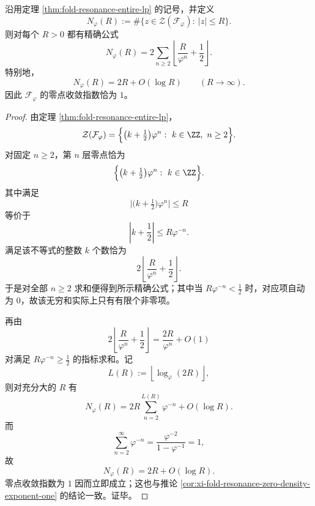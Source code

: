 \begin{theorem}\label{cor:xi-resonance-entire-zero-count-explicit-linear-density}
沿用定理 \ref{thm:fold-resonance-entire-lp} 的记号，并定义
\[
N_\varphi(R):=\#\{z\in \mathcal Z(\mathcal F_\varphi):\ |z|\le R\}.
\]
则对每个 \(R>0\) 都有精确公式
\[
\boxed{\;
N_\varphi(R)=
2\sum_{n\ge 2}\left\lfloor \frac{R}{\varphi^n}+\frac12\right\rfloor.\;}
\]
特别地，
\[
\boxed{\;
N_\varphi(R)=2R+O(\log R)
\qquad (R\to\infty).\;}
\]
因此 \(\mathcal F_\varphi\) 的零点收敛指数恰为 \(1\)。
\end{theorem}
\begin{proof}
由定理 \ref{thm:fold-resonance-entire-lp}，
\[
\mathcal Z(\mathcal F_\varphi)
=
\Bigl\{\bigl(k+\tfrac12\bigr)\varphi^n:\ k\in\ZZ,\ n\ge 2\Bigr\}.
\]
对固定 \(n\ge 2\)，第 \(n\) 层零点恰为
\[
\Bigl\{\bigl(k+\tfrac12\bigr)\varphi^n:\ k\in\ZZ\Bigr\}.
\]
其中满足
\[
\bigl|\bigl(k+\tfrac12\bigr)\varphi^n\bigr|\le R
\]
等价于
\[
\left|k+\frac12\right|\le R\varphi^{-n}.
\]
满足该不等式的整数 \(k\) 个数恰为
\[
2\left\lfloor \frac{R}{\varphi^n}+\frac12\right\rfloor.
\]
于是对全部 \(n\ge 2\) 求和便得到所示精确公式；其中当 \(R\varphi^{-n}<\frac12\) 时，对应项自动为 \(0\)，故该无穷和实际上只有有限个非零项。

再由
\[
2\left\lfloor \frac{R}{\varphi^n}+\frac12\right\rfloor
=
\frac{2R}{\varphi^n}+O(1)
\]
对满足 \(R\varphi^{-n}\ge \frac12\) 的指标求和。记
\[
L(R):=\left\lfloor \log_\varphi(2R)\right\rfloor,
\]
则对充分大的 \(R\) 有
\[
N_\varphi(R)
=
2R\sum_{n=2}^{L(R)}\varphi^{-n}
+O(\log R).
\]
而
\[
\sum_{n=2}^{\infty}\varphi^{-n}
=
\frac{\varphi^{-2}}{1-\varphi^{-1}}
=
1,
\]
故
\[
N_\varphi(R)=2R+O(\log R).
\]
零点收敛指数为 \(1\) 因而立即成立；这也与推论
\ref{cor:xi-fold-resonance-zero-density-exponent-one} 的结论一致。证毕。
\end{proof}



